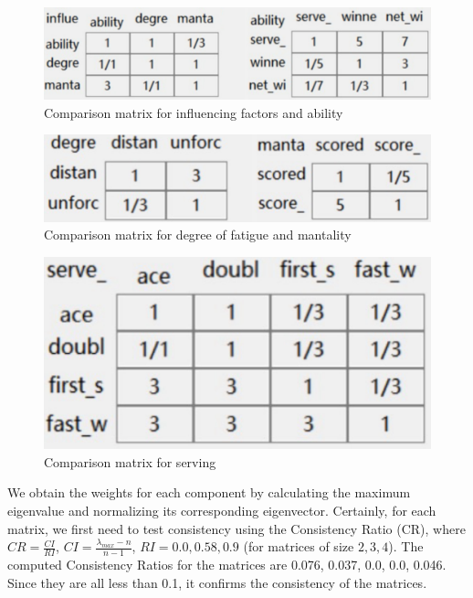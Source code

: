 \begin{figure}[H]
    \centering
    \includegraphics[scale=0.06]{mainmatter/imgs/2.jpg}
    \caption{Comparison matrix for influencing factors and ability}
\end{figure}
\begin{figure}[H]
    \centering
    \includegraphics[scale=0.06]{mainmatter/imgs/3.jpg}
    \caption{Comparison matrix for degree of fatigue and mantality}
\end{figure}
\begin{figure}[H]
    \centering
    \includegraphics[scale=0.06]{mainmatter/imgs/4.jpg}
    \caption{Comparison matrix for serving}
\end{figure}

We obtain the weights for each component by calculating the maximum eigenvalue and normalizing 
its corresponding eigenvector. Certainly, for each matrix, we first need to test consistency 
using the Consistency Ratio (CR), where \(CR=\frac{CI}{RI}\), \(CI=\frac{\lambda_{max}-n}{n-1}\), 
\(RI=0.0, 0.58, 0.9\) (for matrices of size \(2, 3, 4\)). The computed Consistency Ratios for the 
matrices are 0.076, 0.037, 0.0, 0.0, 0.046. Since they are all less than 0.1, it confirms the 
consistency of the matrices.\\

